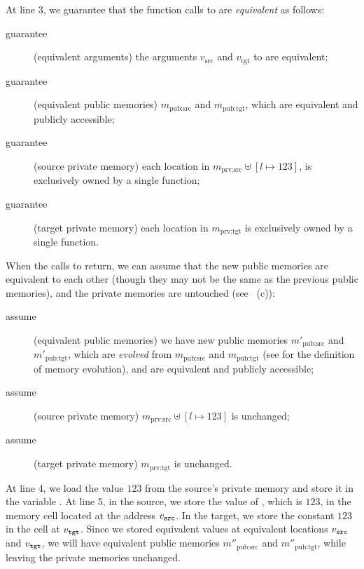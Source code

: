 At line 3, we guarantee that the function calls to  are
\emph{equivalent} as follows:
\begin{description}
\item[guarantee] (equivalent arguments) 
  the arguments $v_\textrm{src}$ and $v_\textrm{tgt}$ to  are equivalent; 
\item[guarantee] (equivalent public memories) 
  $m_\textrm{pub:src}$ and $m_\textrm{pub:tgt}$,
  which are equivalent and publicly accessible;
\item[guarantee] (source private memory) 
  each location in $m_\textrm{prv:src} \uplus {[l\mapsto 123]}$,
  is exclusively owned by a single function;
\item[guarantee] (target private memory) 
  each location in $m_\textrm{prv:tgt}$
  is exclusively owned by a single function.
\end{description}
When the calls to  return,
we can assume that the new public
memories are equivalent to each other (though they may not be the same as the previous public memories), and
the private memories are untouched (see ~(c)):
\begin{description}
\item[assume] (equivalent public memories) we have new public memories $m'_\textrm{pub:src}$ and
  $m'_\textrm{pub:tgt}$, which are \emph{evolved} from $m_\textrm{pub:src}$
  and $m_\textrm{pub:tgt}$ (see  for the definition of memory evolution), and 
  are equivalent and publicly accessible;
\item[assume] (source private memory) $m_\textrm{prv:src} \uplus
  {[l\mapsto 123]}$ is unchanged;
\item[assume] (target private memory) $m_\textrm{prv:tgt}$ is
  unchanged.
\end{description}

At line 4, we load the value $123$ from the source's private memory and
store it in the variable .  At line 5, in the source, we
store the value of , which is $123$, in the memory cell located at
the address $v_{\texttt{src}}$.  In the target, we store the constant
$123$ in the cell at $v_{\texttt{tgt}}$. Since we stored equivalent
values at equivalent locations $v_{\texttt{src}}$ and $v_{\texttt{tgt}}$,
we will have equivalent public memories $m''_\textrm{pub:src}$ and
$m''_\textrm{pub:tgt}$, while leaving the private memories unchanged.

